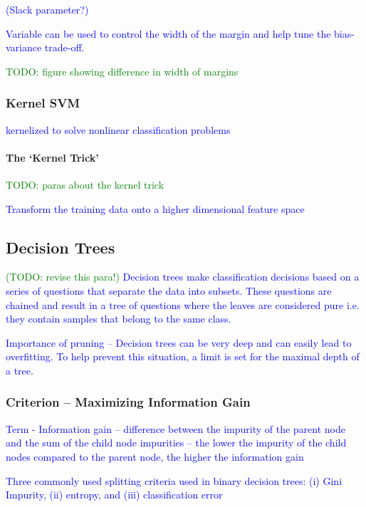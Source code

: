 \textcolor{blue}{(Slack parameter?)}

\textcolor{blue}{Variable can be used to control the width of the margin and help tune the bias-variance trade-off.}

\textcolor{green}{TODO: figure showing difference in width of margins}

\subsubsection{Kernel SVM}

\textcolor{blue}{kernelized to solve nonlinear classification problems}

\paragraph{The `Kernel Trick'}

\textcolor{green}{TODO: paras about the kernel trick}

\textcolor{blue}{Transform the training data onto a higher dimensional feature space}

\subsection{Decision Trees}

\textcolor{blue}{\textcolor{green}{(TODO: revise this para!)} Decision trees make classification decisions based on a series of questions that separate the data into subsets. These questions are chained and result in a tree of questions where the leaves are considered pure i.e. they contain samples that belong to the same class.}

\textcolor{blue}{Importance of pruning -- Decision trees can be very deep and can easily lead to overfitting. To help prevent this situation, a limit is set for the maximal depth of a tree. }

\subsubsection{Criterion -- Maximizing Information Gain}

\textcolor{blue}{Term - Information gain -- difference between the impurity of the parent node and the sum of the child node impurities -- the lower the impurity of the child nodes compared to the parent node, the higher the information gain}

\textcolor{blue}{Three commonly used splitting criteria used in binary decision trees: (i) Gini Impurity, (ii) entropy, and (iii) classification error}

